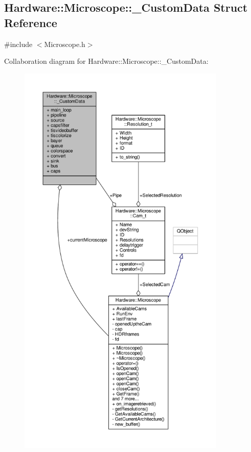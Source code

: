 \hypertarget{struct_hardware_1_1_microscope_1_1___custom_data}{}\subsection{Hardware\+:\+:Microscope\+:\+:\+\_\+\+Custom\+Data Struct Reference}
\label{struct_hardware_1_1_microscope_1_1___custom_data}


{\ttfamily \#include $<$Microscope.\+h$>$}



Collaboration diagram for Hardware\+:\+:Microscope\+:\+:\+\_\+\+Custom\+Data\+:
\nopagebreak
\begin{figure}[H]
\begin{center}
\leavevmode
\includegraphics[height=550pt]{struct_hardware_1_1_microscope_1_1___custom_data__coll__graph}
\end{center}
\end{figure}
